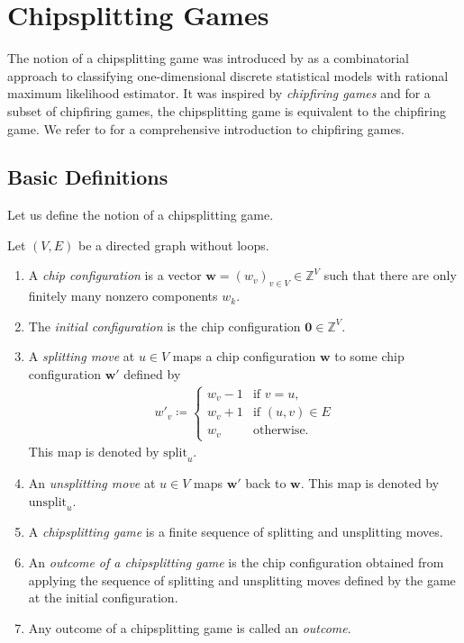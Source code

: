 \chapter{Chipsplitting Games}

The notion of a chipsplitting game was introduced by \cite{bik2022classifying} as a combinatorial approach to classifying one-dimensional discrete statistical models with rational maximum likelihood estimator. It was inspired by \emph{chipfiring games} and for a subset of chipfiring games, the chipsplitting game is equivalent to the chipfiring game. We refer to \cite{klivans2018mathematics} for a comprehensive introduction to chipfiring games. 

\section{Basic Definitions}

Let us define the notion of a chipsplitting game.

\begin{definition}
    Let $(V,E)$ be a directed graph without loops.

    \begin{enumerate}
        \item A \emph{chip configuration} is a vector \( \mathbf{w} = (w_v)_{v \in V} \in \mathbb{Z}^{V} \) such that there are only finitely many nonzero components \( w_k \).
        \item The \emph{initial configuration} is the chip configuration \( \mathbf 0 \in \mathbb{Z}^V \).
        \item A \emph{splitting move} at \( u \in V \) maps a chip configuration \( \mathbf w \) to some chip configuration \( \mathbf{w}' \) defined by 
        \begin{align*}
            w'_v \coloneqq \begin{cases}
                w_v -1 & \text{if } v = u, \\
                w_v + 1 & \text{if } (u,v) \in E \\
                w_v & \text{otherwise}.
            \end{cases}
        \end{align*}
        This map is denoted by \( \mathrm{split}_u \).
        \item An \emph{unsplitting move} at \( u \in V \) maps \( \mathbf w' \) back to \( \mathbf{w} \). This map is denoted by \( \mathrm{unsplit}_u \).
        \item A \emph{chipsplitting game} is a finite sequence of splitting and unsplitting moves.
        \item An \emph{outcome of a chipsplitting game} is the chip configuration obtained from applying the sequence of splitting and unsplitting moves defined by the game at the initial configuration.
        \item Any outcome of a chipsplitting game is called an \emph{outcome}.
    \end{enumerate}
\end{definition}

